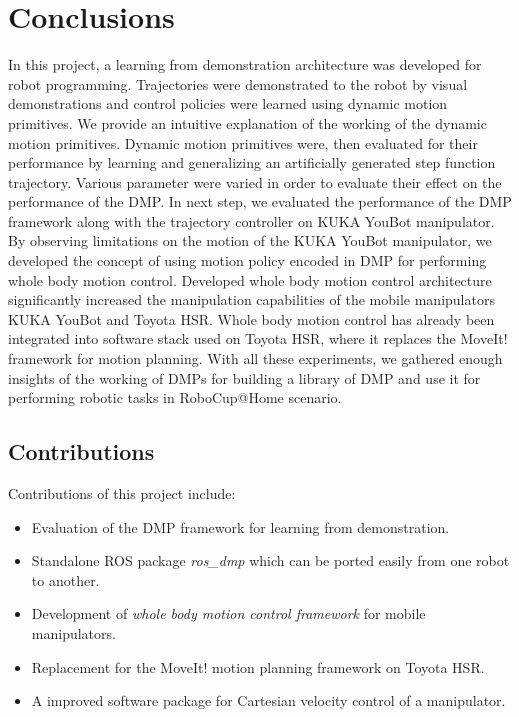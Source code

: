 
\chapter{Conclusions}

In this project, a learning from demonstration architecture was developed for robot programming. Trajectories were demonstrated to the robot by visual demonstrations and control policies were learned using dynamic motion primitives. We provide an intuitive explanation of the working of the dynamic motion primitives. Dynamic motion primitives were, then evaluated for their performance by learning and generalizing an artificially generated step function trajectory. Various parameter were varied in order to evaluate their effect on the performance of the DMP. In next step, we evaluated the performance of the DMP framework along with the trajectory controller on KUKA YouBot manipulator. By observing limitations on the motion of the KUKA YouBot manipulator, we developed the concept of using motion policy encoded in DMP for performing whole body motion control. Developed whole body motion control architecture significantly increased the manipulation capabilities of the mobile manipulators KUKA YouBot and Toyota HSR. Whole body motion control has already been integrated into software stack used on Toyota HSR, where it replaces the MoveIt! framework for motion planning. With all these experiments, we gathered enough insights of the working of DMPs for building a library of DMP and use it for performing robotic tasks in RoboCup@Home scenario.  

\section{Contributions}

Contributions of this project include:
\begin{itemize}
	\item Evaluation of the DMP framework for learning from demonstration.
	\item Standalone ROS package \textit{ros\_dmp} which can be ported easily from one robot to another. 
	\item Development of \textit{whole body motion control framework} for mobile manipulators.
	\item Replacement for the MoveIt! motion planning framework on Toyota HSR.
	\item A improved software package for Cartesian velocity control of a manipulator.
\end{itemize}

